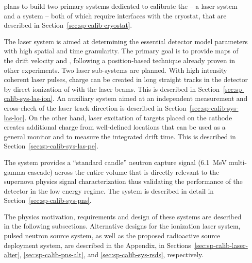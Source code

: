  plans to build two primary systems dedicated to %
calibrate the  -- a laser system
and a  system -- both of which require interfaces with the cryostat, that are described in Section~\ref{sec:sp-calib-cryostat}. 

The laser system is aimed at %
determining the essential detector model parameters with high spatial and time granularity. The primary goal is to provide maps of the drift velocity and \efield, following a position-based technique already proven in other  experiments. 
Two laser sub-systems are planned. 
With high intensity coherent laser pulses, charge can be created in long straight tracks in the detector by direct ionization of  with the laser beams. This is described in Section~\ref{sec:sp-calib-sys-las-ion}. An auxiliary system aimed at an independent measurement and cross-check of the laser track direction is described in Section~\ref{sec:sp-calib-sys-las-loc}.
On the other hand, laser excitation of targets placed on the cathode creates additional charge from well-defined locations that can be used %
as a general  monitor and to measure the integrated drift time. This is described in Section~\ref{sec:sp-calib-sys-las-pe}. 

The  system %
provides a ``standard candle'' neutron capture signal (\SI{6.1}{\MeV} multi-gamma cascade) across the entire  volume that is directly relevant to the supernova physics signal characterization thus validating the performance of the detector in the low energy regime. The  system is described in detail in Section~\ref{sec:sp-calib-sys-pns}.  

The physics motivation, requirements and design of these systems are described in the following subsections. Alternative designs
for the ionization laser system, pulsed neutron source system, as well as the proposed radioactive source deployment system, are described in the Appendix, in Sections~\ref{sec:sp-calib-laser-alter}, \ref{sec:sp-calib-pns-alt}, and \ref{sec:sp-calib-sys-rsds}, respectively.